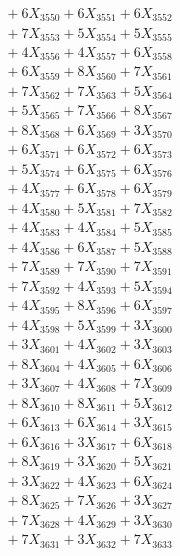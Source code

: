 \documentclass[a4paper,10pt]{article}
\begin{document}
{\begin{align}
&\;  + 6 X_{3550} + 6 X_{3551} + 6 X_{3552} \\[0.3ex]
&\;  + 7 X_{3553} + 5 X_{3554} + 5 X_{3555} \\[0.3ex]
&\;  + 4 X_{3556} + 4 X_{3557} + 6 X_{3558} \\[0.3ex]
&\;  + 6 X_{3559} + 8 X_{3560} + 7 X_{3561} \\[0.3ex]
&\;  + 7 X_{3562} + 7 X_{3563} + 5 X_{3564} \\[0.3ex]
&\;  + 5 X_{3565} + 7 X_{3566} + 8 X_{3567} \\[0.3ex]
&\;  + 8 X_{3568} + 6 X_{3569} + 3 X_{3570} \\[0.3ex]
&\;  + 6 X_{3571} + 6 X_{3572} + 6 X_{3573} \\[0.3ex]
&\;  + 5 X_{3574} + 6 X_{3575} + 6 X_{3576} \\[0.3ex]
&\;  + 4 X_{3577} + 6 X_{3578} + 6 X_{3579} \\[0.5ex]\allowbreak
&\;  + 4 X_{3580} + 5 X_{3581} + 7 X_{3582} \\[0.3ex]
&\;  + 4 X_{3583} + 4 X_{3584} + 5 X_{3585} \\[0.3ex]
&\;  + 4 X_{3586} + 6 X_{3587} + 5 X_{3588} \\[0.3ex]
&\;  + 7 X_{3589} + 7 X_{3590} + 7 X_{3591} \\[0.3ex]
&\;  + 7 X_{3592} + 4 X_{3593} + 5 X_{3594} \\[0.3ex]
&\;  + 4 X_{3595} + 8 X_{3596} + 6 X_{3597} \\[0.3ex]
&\;  + 4 X_{3598} + 5 X_{3599} + 3 X_{3600} \\[0.3ex]
&\;  + 3 X_{3601} + 4 X_{3602} + 3 X_{3603} \\[0.3ex]
&\;  + 8 X_{3604} + 4 X_{3605} + 6 X_{3606} \\[0.3ex]
&\;  + 3 X_{3607} + 4 X_{3608} + 7 X_{3609} \\[0.5ex]\allowbreak
&\;  + 8 X_{3610} + 8 X_{3611} + 5 X_{3612} \\[0.3ex]
&\;  + 6 X_{3613} + 6 X_{3614} + 3 X_{3615} \\[0.3ex]
&\;  + 6 X_{3616} + 3 X_{3617} + 6 X_{3618} \\[0.3ex]
&\;  + 8 X_{3619} + 3 X_{3620} + 5 X_{3621} \\[0.3ex]
&\;  + 3 X_{3622} + 4 X_{3623} + 6 X_{3624} \\[0.3ex]
&\;  + 8 X_{3625} + 7 X_{3626} + 3 X_{3627} \\[0.3ex]
&\;  + 7 X_{3628} + 4 X_{3629} + 3 X_{3630} \\[0.3ex]
&\;  + 7 X_{3631} + 3 X_{3632} + 7 X_{3633} \\[0.3ex]

\end{align}}
\end{document}
